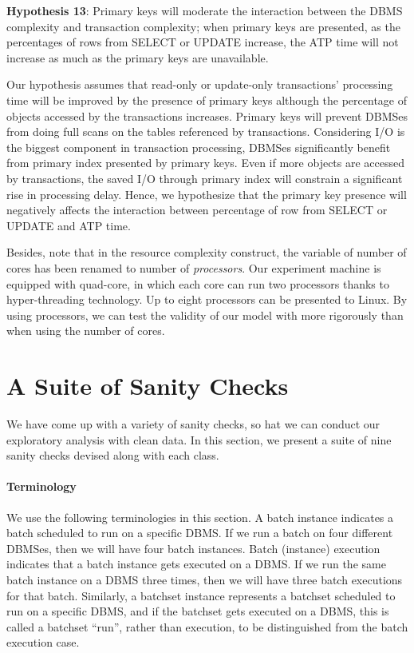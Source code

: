 {\bf Hypothesis 13}: Primary keys will moderate the interaction between the DBMS complexity and transaction complexity; 
when primary keys are presented, as the percentages of rows from SELECT or UPDATE 
increase, the ATP time will not increase as much as the primary keys are unavailable.

\noindent 
Our hypothesis assumes that read-only or update-only transactions' processing time 
will be improved by the presence of primary keys although the percentage of objects accessed by the transactions 
increases. 
Primary keys will prevent DBMSes from doing full scans on the tables referenced by transactions. 
Considering I/O is the biggest component in transaction processing, 
DBMSes significantly benefit from primary index presented by primary keys. 
Even if more objects are accessed by transactions, the saved I/O through primary index 
will constrain a significant rise in processing delay.
Hence, we hypothesize that the primary key presence will negatively affects 
the interaction between percentage of row from SELECT or UPDATE and ATP time.

Besides, note that in the resource complexity construct, 
the variable of number of cores has been renamed to number of {\em processors}. 
Our experiment machine is equipped with quad-core, in which 
each core can run two processors thanks to hyper-threading technology.
Up to eight processors can be presented to Linux. 
By using processors, we can test the validity of our model with more rigorously than when using the number of cores.

\section{A Suite of Sanity Checks}\label{sec:sanity_checks}


We have come up with a variety of sanity checks, 
so hat we can conduct our exploratory analysis with clean data.
In this section, we present a suite of nine sanity checks devised along with each class. 

\paragraph{Terminology} 
We use the following terminologies in this section. 
A batch instance indicates a batch scheduled to run on a specific \hbox{DBMS}.
If we run a batch on four different \hbox{DBMSes}, then we will have four batch instances. 
Batch (instance) execution indicates that a batch instance gets executed on a \hbox{DBMS}.
If we run the same batch instance on a \hbox{DBMS} three times, then we will have three batch executions for that batch.
Similarly, a batchset instance represents a batchset scheduled to run on a specific \hbox{DBMS}, 
and if the batchset gets executed on a \hbox{DBMS}, this is called a batchset ``run'', rather than execution, 
to be distinguished from the batch execution case.

